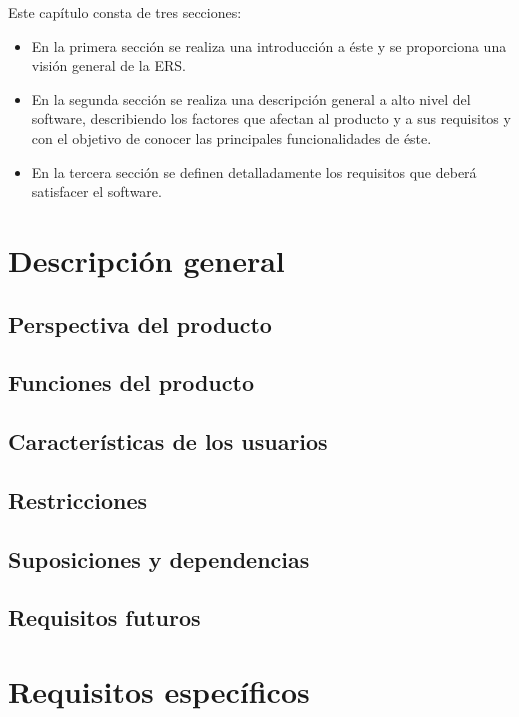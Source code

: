 Este capítulo consta de tres secciones:
\begin{itemize}
	\item En la primera sección se realiza una introducción a éste y se proporciona una visión general de la ERS.
	\item En la segunda sección se realiza una descripción general a alto nivel del software, describiendo los factores que afectan al producto y a sus requisitos y con el objetivo de conocer las principales funcionalidades de éste.
	\item En la tercera sección se definen detalladamente los requisitos que deberá satisfacer el software.
\end{itemize}

\section{Descripción general}

\subsection{Perspectiva del producto}

\subsection{Funciones del producto}

\subsection{Características de los usuarios}

\subsection{Restricciones}

\subsection{Suposiciones y dependencias}

\subsection{Requisitos futuros}

\section{Requisitos específicos}

